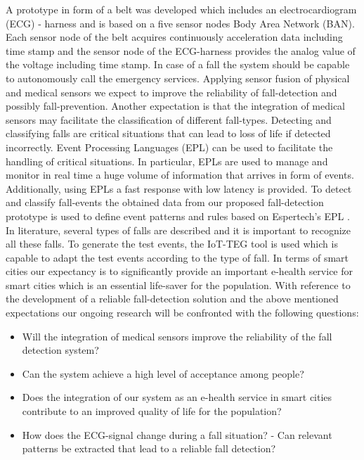 \documentclass[review]{elsarticle}
\begin{document}
A prototype in form of a belt was developed which includes an electrocardiogram (ECG) - harness and is based on a five sensor nodes Body Area Network (BAN). Each sensor node of the belt acquires continuously acceleration data including time stamp and the sensor node of the ECG-harness provides the analog value of the voltage including time stamp. In case of a fall the system should be capable to autonomously call the emergency services. Applying sensor fusion of physical and medical sensors we expect to improve the reliability of fall-detection and possibly fall-prevention. Another expectation is that the integration of medical sensors may facilitate the classification of different fall-types. Detecting and classifying falls are critical situations that can lead to loss of life if detected incorrectly. Event Processing Languages (EPL) can be used to facilitate the handling of critical situations. In particular, EPLs are used to manage and monitor in real time a huge volume of information that arrives in form of events. Additionally, using EPLs a fast response with low latency is provided. To detect and classify fall-events the obtained data from our proposed fall-detection prototype is used to define event patterns and rules based on Espertech's EPL \cite{Esper:2016}. In literature, several types of falls are described and it is important to recognize all these falls. To generate the test events, the IoT-TEG tool is used which is capable to adapt the test events according to the type of fall.
In terms of smart cities our expectancy is to significantly provide an important e-health service for smart cities which is an essential life-saver for the population. With reference to the development of a reliable fall-detection solution and the above mentioned expectations our ongoing research will be confronted with the following questions:
\begin{itemize}
	\item Will the integration of medical sensors improve the reliability of the fall detection system?
	\item Can the system achieve a high level of acceptance among people?
	\item Does the integration of our system as an e-health service in smart cities contribute to an improved quality of life for the population?
	\item How does the ECG-signal change during a fall situation? - Can relevant patterns be extracted that lead to a reliable fall detection?
	
\end{itemize}
\end{document}
